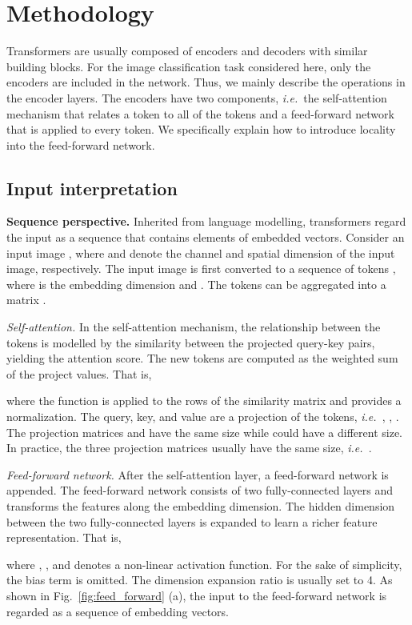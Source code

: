 \documentclass[10pt,twocolumn,letterpaper]{article}
\def\ie{\emph{i.e.\ }}
\begin{document}
\section{Methodology}
\label{sec:methodology}


Transformers are usually composed of encoders and decoders with similar building blocks. For the image classification task considered here, only the encoders are included in the network. Thus, we mainly describe the operations in the encoder layers. The encoders have two components, \ie the self-attention mechanism that relates a token to all of the tokens and a feed-forward network that is applied to every token. We specifically explain how to introduce locality into the feed-forward network.


\subsection{Input interpretation}
\label{subsec:input_interpretation}


\textbf{Sequence perspective.}
Inherited from language modelling, transformers regard the input as a sequence that contains elements of embedded vectors. Consider an input image , where  and  denote the channel and spatial dimension of the input image, respectively. The input image is first converted to a sequence of tokens , where  is the embedding dimension and . The tokens can be aggregated into a matrix .

\textit{Self-attention.} 
In the self-attention mechanism, the relationship between the tokens is modelled by the similarity between the projected query-key pairs, yielding the attention score. The new tokens are computed as the weighted sum of the project values. That is,

where the  function is applied to the rows of the similarity matrix and  provides a normalization. 
The query, key, and value are a projection of the tokens, \ie , , . The projection matrices  and  have the same size while  could have a different size. In practice, the three projection matrices usually have the same size, \ie .

\textit{Feed-forward network.}
After the self-attention layer, a feed-forward network is appended. The feed-forward network consists of two fully-connected layers and transforms the features along the embedding dimension. The hidden dimension between the two fully-connected layers is expanded to learn a richer feature representation. That is,

where , , and  denotes a non-linear activation function. For the sake of simplicity, the bias term is omitted. The dimension expansion ratio  is usually set to 4. As shown in Fig.~\ref{fig:feed_forward} (a), the input to the feed-forward network is regarded as a sequence of embedding vectors. 
\end{document}
